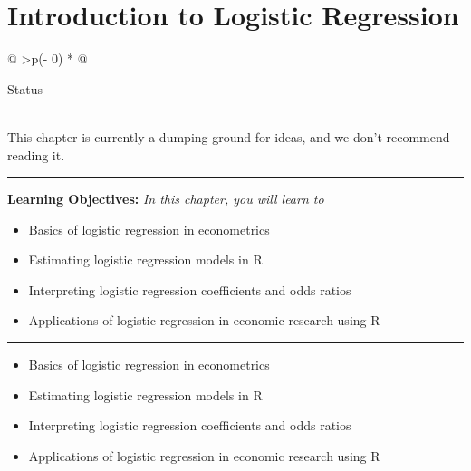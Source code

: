 \documentclass[
  letterpaper,
  paper =a4,
  twoside,
  openright,
  headsepline,
  footsepline,
  listof = totocnumbered,
  chapterprefix = true,
  firstiscover]{scrbook}
\providecommand{\abstractname}{Learning Objectives} %
\newenvironment{objectives}[1]{%
	\hrule
	\vspace{5pt}
	\small\textbf{\abstractname: } 
	\newline
	\vspace{0.1cm}
	\small\emph{#1} %
	\itshape %
}{%
	\vspace{5pt}
	\hrule
	\vspace{0.6cm}
}
\begin{document}

\hypertarget{introduction-to-logistic-regression}{%
\chapter{Introduction to Logistic
Regression}\label{introduction-to-logistic-regression}}

\begin{longtable}[]{@{}
  >{\centering\arraybackslash}p{(\columnwidth - 0\tabcolsep) * }@{}}
\toprule\noalign{}
\begin{minipage}[b]{\linewidth}\centering
Status
\end{minipage} \\
\midrule\noalign{}
\endhead
\bottomrule\noalign{}
\endlastfoot
This chapter is currently a dumping ground for ideas, and we don't
recommend reading it. \\
\end{longtable}

\begin{objectives}{In this chapter, you will learn to}
\begin{itemize}

\item{Basics of logistic regression in econometrics}

\item{Estimating logistic regression models in R}

\item{Interpreting logistic regression coefficients and odds ratios}

\item{Applications of logistic regression in economic research using R}

\end{itemize}

\end{objectives}

\begin{itemize}
\item
  Basics of logistic regression in econometrics
\item
  Estimating logistic regression models in R
\item
  Interpreting logistic regression coefficients and odds ratios
\item
  Applications of logistic regression in economic research using R
\end{itemize}

\end{document}
